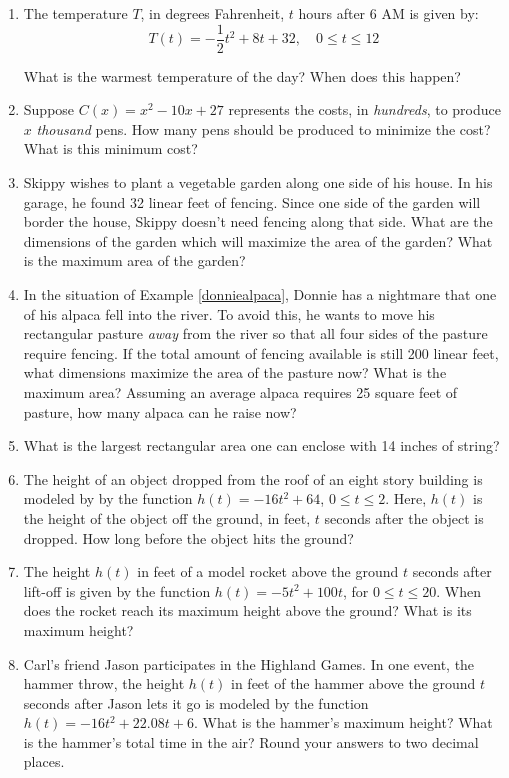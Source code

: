 \begin{enumerate}
\item  The temperature $T$, in degrees Fahrenheit, $t$ hours after 6 AM is given by: \[ T(t) = -\frac{1}{2} t^2 + 8t+32, \quad 0 \leq t \leq 12\]

What is the warmest temperature of the day?  When does this happen?

\item  Suppose $C(x) = x^2-10x+27$ represents the costs, in \textit{hundreds}, to produce $x$ \textit{thousand} pens.  How many pens should be produced to minimize the cost?  What is this minimum cost?

\item \label{fixedperimetermaxareagarden} Skippy wishes to plant a vegetable garden along one side of his house.  In his garage, he found 32 linear feet of fencing.  Since one side of the garden will border the house, Skippy doesn't need fencing along that side.  What are the dimensions of the garden which will maximize the area of the garden?  What is the maximum  area of the garden?

\item In the situation of Example \ref{donniealpaca}, Donnie has a nightmare that one of his alpaca fell into the river.  To avoid this, he wants to move his rectangular pasture \textit{away} from the river so that all four sides of the pasture require fencing.  If the total amount of fencing available is still 200 linear feet, what dimensions maximize the area of the pasture now?  What is the maximum area?  Assuming an average alpaca requires 25 square feet of pasture, how many alpaca can he raise now?

\item What is the largest rectangular area one can enclose with 14 inches of string?


\item  The height of an object dropped from the roof of an eight story building is modeled by  by the function $h(t) = -16t^2 + 64$, $0 \leq t \leq 2$. Here,  $h(t)$ is the height of the object off the ground, in feet, $t$ seconds after the object is dropped.  How long before the object hits the ground?

\item  The height $h(t)$ in feet of a model rocket above the ground $t$ seconds after lift-off is given by the function $h(t) = -5t^2+100t$, for $0 \leq t \leq 20$.  When does the rocket reach its maximum height above the ground?  What is its maximum height?

\item  Carl's friend Jason participates in the Highland Games. In one event, the hammer throw, the height $h(t)$ in feet of the hammer above the ground $t$ seconds after Jason lets it go is modeled by the function $h(t) = -16t^2 +  22.08t + 6$.  What is the hammer's maximum height?  What is the hammer's total time in the air? Round your answers to two decimal places.


\end{enumerate}
